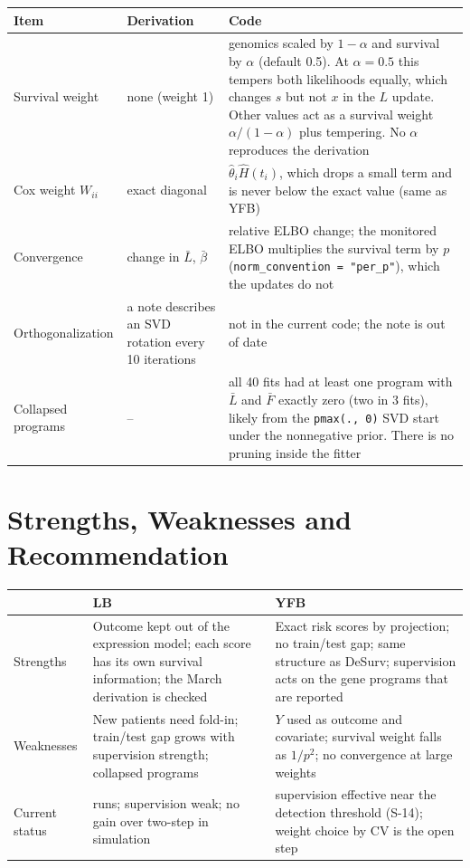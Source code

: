 \documentclass[11pt]{article}
\begin{document}
\begin{center}
\begin{tabularx}{\textwidth}{>{\raggedright\arraybackslash}p{3.2cm}LL}
\toprule
Item & Derivation & Code \\
\midrule
Survival weight & none (weight 1) & genomics scaled by $1-\alpha$ and survival by $\alpha$ (default 0.5). At $\alpha = 0.5$ this tempers both likelihoods equally, which changes $s$ but not $x$ in the $L$ update. Other values act as a survival weight $\alpha/(1-\alpha)$ plus tempering. No $\alpha$ reproduces the derivation \\
Cox weight $W_{ii}$ & exact diagonal & $\hat\theta_i\hat H(t_i)$, which drops a small term and is never below the exact value (same as YFB) \\
Convergence & change in $\bar L$, $\bar\beta$ & relative ELBO change; the monitored ELBO multiplies the survival term by $p$ (\texttt{norm\_convention = "per\_p"}), which the updates do not \\
Orthogonalization & a note describes an SVD rotation every 10 iterations & not in the current code; the note is out of date \\
Collapsed programs & -- & all 40 fits had at least one program with $\bar L$ and $\bar F$ exactly zero (two in 3 fits), likely from the \texttt{pmax(., 0)} SVD start under the nonnegative prior. There is no pruning inside the fitter \\
\bottomrule
\end{tabularx}
\end{center}

\section{Strengths, Weaknesses and Recommendation}

\begin{center}
\begin{tabularx}{\textwidth}{>{\raggedright\arraybackslash}p{2.6cm}LL}
\toprule
 & LB & YFB \\
\midrule
Strengths & Outcome kept out of the expression model; each score has its own survival information; the March derivation is checked & Exact risk scores by projection; no train/test gap; same structure as DeSurv; supervision acts on the gene programs that are reported \\
Weaknesses & New patients need fold-in; train/test gap grows with supervision strength; collapsed programs & $Y$ used as outcome and covariate; survival weight falls as $1/p^2$; no convergence at large weights \\
Current status & runs; supervision weak; no gain over two-step in simulation & supervision effective near the detection threshold (S-14); weight choice by CV is the open step \\
\bottomrule
\end{tabularx}
\end{center}
\end{document}
